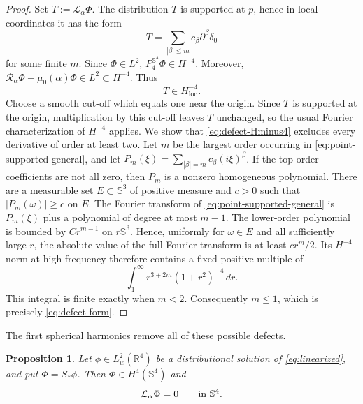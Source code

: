 \documentclass[11pt]{article}
\newtheorem{proposition}[theorem]{Proposition}
\numberwithin{equation}{section}
\begin{document}
\begin{proof}
Set \(T:=\mathcal L_{\alpha}\Phi\). The distribution \(T\) is supported at
\(p\), hence in local coordinates it has the form
\begin{equation}\label{eq:point-supported-general}
T=\sum_{|\beta|\leq m}c_{\beta}\partial^{\beta}\delta_{0}
\end{equation}
for some finite \(m\). Since \(\Phi\in L^{2}\),
\(P_{4}^{\mathbb S^{4}}\Phi\in H^{-4}\). Moreover,
\(\mathcal R_{\alpha}\Phi+\mu_{0}(\alpha)\Phi\in L^{2}\subset H^{-4}\).
Thus
\begin{equation}\label{eq:defect-Hminus4}
T\in H^{-4}_{\operatorname{loc}}.
\end{equation}
Choose a smooth cut-off which equals one near the origin. Since \(T\) is
supported at the origin, multiplication by this cut-off leaves \(T\)
unchanged, so the usual Fourier characterization of \(H^{-4}\) applies. We
show that \eqref{eq:defect-Hminus4} excludes every derivative of order at
least two. Let \(m\) be the largest order occurring in
\eqref{eq:point-supported-general}, and let
\(P_{m}(\xi)=\sum_{|\beta|=m}c_{\beta}(i\xi)^{\beta}\). If the top-order
coefficients are not all zero, then \(P_m\) is a nonzero homogeneous
polynomial. There are a measurable set \(E\subset\mathbb S^3\) of positive
measure and \(c>0\) such that \(|P_m(\omega)|\geq c\) on \(E\). The Fourier
transform of \eqref{eq:point-supported-general} is \(P_m(\xi)\) plus a
polynomial of degree at most \(m-1\). The lower-order polynomial is bounded by
\(Cr^{m-1}\) on \(r\mathbb S^3\). Hence, uniformly for \(\omega\in E\) and all
sufficiently large \(r\), the absolute value of the full Fourier transform is
at least \(cr^m/2\). Its \(H^{-4}\)-norm at high frequency therefore contains
a fixed positive multiple of
\[
\int_{1}^{\infty}r^{3+2m}(1+r^{2})^{-4}\,dr.
\]
This integral is finite exactly when \(m<2\). Consequently \(m\leq1\), which
is precisely \eqref{eq:defect-form}.
\end{proof}

The first spherical harmonics remove all of these possible defects.

\begin{proposition}\label{prop:global-sphere-equation}
Let \(\phi\in L^{2}_{w}(\mathbb R^{4})\) be a distributional solution of
\eqref{eq:linearized}, and put \(\Phi=S_{*}\phi\). Then
\(\Phi\in H^{4}(\mathbb S^{4})\) and
\begin{equation*}
\mathcal L_{\alpha}\Phi=0
\qquad\hbox{in }\mathbb S^{4}.
\end{equation*}
\end{proposition}
\end{document}
